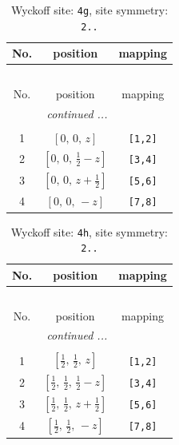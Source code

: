 \documentclass[fleqn,8pt]{jsarticle}
\begin{document}
\begin{longtable}{ccc}
\caption{Wyckoff site: {\tt 4g}, site symmetry: {\tt 2..}}
 \\
 \hline \hline
No. & position & mapping \\ \hline \endfirsthead

\multicolumn{2}{l}{\tablename\ \thetable{}} \\
 \hline \hline
No. & position & mapping \\ \hline \endhead

 \hline \hline
\multicolumn{2}{r}{\footnotesize\it continued ...} \\ \endfoot

 \hline \hline
\multicolumn{2}{r}{} \\ \endlastfoot

1 & $\left[ 0,\, 0,\, z \right]$ & {\tt [1,2]} \\ \hline
2 & $\left[ 0,\, 0,\, \frac{1}{2} - z \right]$ & {\tt [3,4]} \\ \hline
3 & $\left[ 0,\, 0,\, z + \frac{1}{2} \right]$ & {\tt [5,6]} \\ \hline
4 & $\left[ 0,\, 0,\, - z \right]$ & {\tt [7,8]} \\
\end{longtable}
\renewcommand{\arraystretch}{1.2}
\begin{longtable}{ccc}
\caption{Wyckoff site: {\tt 4h}, site symmetry: {\tt 2..}}
 \\
 \hline \hline
No. & position & mapping \\ \hline \endfirsthead

\multicolumn{2}{l}{\tablename\ \thetable{}} \\
 \hline \hline
No. & position & mapping \\ \hline \endhead

 \hline \hline
\multicolumn{2}{r}{\footnotesize\it continued ...} \\ \endfoot

 \hline \hline
\multicolumn{2}{r}{} \\ \endlastfoot

1 & $\left[ \frac{1}{2},\, \frac{1}{2},\, z \right]$ & {\tt [1,2]} \\ \hline
2 & $\left[ \frac{1}{2},\, \frac{1}{2},\, \frac{1}{2} - z \right]$ & {\tt [3,4]} \\ \hline
3 & $\left[ \frac{1}{2},\, \frac{1}{2},\, z + \frac{1}{2} \right]$ & {\tt [5,6]} \\ \hline
4 & $\left[ \frac{1}{2},\, \frac{1}{2},\, - z \right]$ & {\tt [7,8]} \\
\end{longtable}
\end{document}
